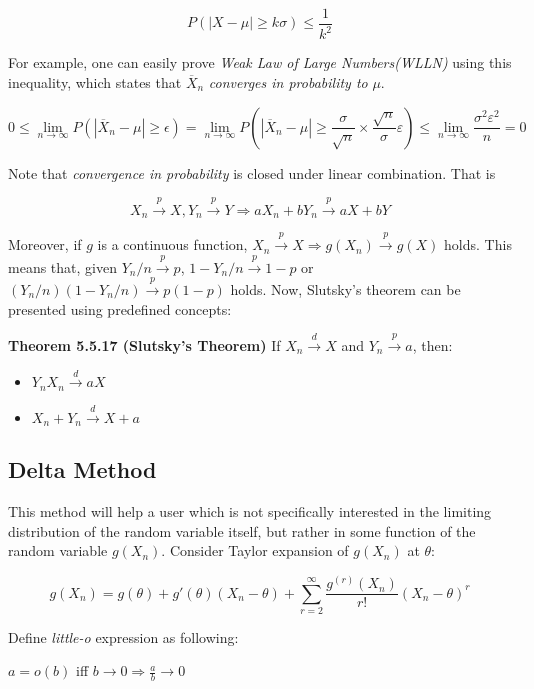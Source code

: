 \documentclass[10pt]{article}
\begin{document}
$$
\displaystyle P(|X-\mu|\geq k\sigma)\leq \frac{1}{k^2}
$$

\noindent For example, one can easily prove \textit{Weak Law of Large Numbers(WLLN)} using this inequality, which states that $\overline{X}_n$ \textit{converges in probability to} $\mu$.

$$
\displaystyle 0\leq\lim_{n\rightarrow\infty}P(|\overline{X}_n-\mu|\geq\epsilon)=\lim_{n\rightarrow\infty}P(|\overline{X}_n-\mu|\geq\frac{\sigma}{\sqrt{n}}\times\frac{\sqrt{n}}{\sigma}\varepsilon)\leq\lim_{n\rightarrow\infty}\frac{\sigma^2\varepsilon^2}{n}=0
$$

\noindent Note that \textit{convergence in probability} is closed under linear combination. That is

$$
X_n \overset{p}{\to} X, Y_n \overset{p}{\to} Y \Rightarrow aX_n+bY_n \overset{p}{\to} aX+bY
$$

\noindent Moreover, if $g$ is a continuous function, $X_n \overset{p}{\to} X\Rightarrow g(X_n) \overset{p}{\to} g(X)$ holds. This means that, given $Y_n/n \overset{p}{\to} p$, $1-Y_n/n \overset{p}{\to} 1-p$ or $(Y_n/n)(1-Y_n/n) \overset{p}{\to} p(1-p)$ holds. Now, Slutsky's theorem can be presented using predefined concepts:\bigskip

\noindent \textbf{Theorem 5.5.17 (Slutsky's Theorem)} If $X_n \overset{d}{\to} X$ and $Y_n \overset{p}{\to} a$, then:
\begin{itemize}
    \item $Y_nX_n \overset{d}{\to} aX$
    \item $X_n+Y_n \overset{d}{\to} X+a$
\end{itemize}


\subsection{Delta Method}
This method will help a user which is not specifically interested in the limiting distribution of the random variable itself, but rather in some function of the random variable $g(X_n)$. Consider Taylor expansion of $g(X_n)$ at $\theta$:

$$
g(X_n)=g(\theta)+g'(\theta)(X_n-\theta)+\displaystyle \sum_{r=2}^{\infty}\frac{g^{(r)}(X_n)}{r!}(X_n-\theta)^r
$$

\noindent Define \textit{little-o} expression as following:

\begin{center}
    $a=o(b)$ iff  $b \rightarrow 0 \Rightarrow \frac{a}{b} \rightarrow 0$
\end{center}
\end{document}
